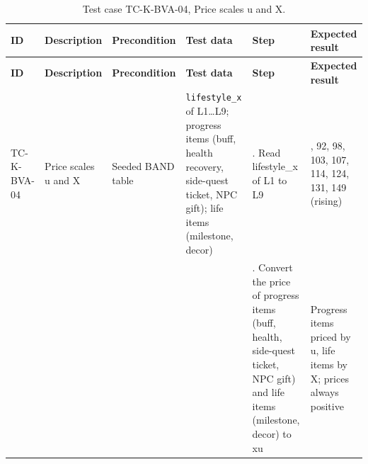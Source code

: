 {\footnotesize{}\renewcommand{\arraystretch}{1.1}
\begin{longtable}{|>{\raggedright\arraybackslash}p{}|>{\raggedright\arraybackslash}p{}|>{\raggedright\arraybackslash}p{}|>{\raggedright\arraybackslash}p{}|>{\raggedright\arraybackslash}p{}|>{\raggedright\arraybackslash}p{}|}
\caption{Test case TC-\allowbreak{}K-\allowbreak{}BVA-\allowbreak{}04, Price scales u and X.} \\
\hline
\textbf{ID} & \textbf{Description} & \textbf{Precondition} & \textbf{Test data} & \textbf{Step} & \textbf{Expected result} \\ \hline
\endfirsthead
\hline
\textbf{ID} & \textbf{Description} & \textbf{Precondition} & \textbf{Test data} & \textbf{Step} & \textbf{Expected result} \\ \hline
\endhead
TC-K-BVA-04 & Price scales u and X & Seeded BAND table & \texttt{lifestyle\_\allowbreak{}x} of L1…L9; progress items (buff, health recovery, side-quest ticket, NPC gift); life items (milestone, decor) & 1. Read lifestyle\_x of L1 to L9 & 84, 92, 98, 103, 107, 114, 124, 131, 149 (rising) \\ \cline{5-6}
 &  &  &  & 2. Convert the price of progress items (buff, health, side-quest ticket, NPC gift) and life items (milestone, decor) to xu & Progress items priced by u, life items by X; prices always positive \\ \hline
\end{longtable}
}

